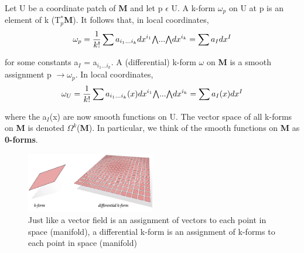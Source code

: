 Let U be a coordinate patch of \textbf{M} and let p $\epsilon$ U. A k-form $\omega_p$ on U at p is an element of k (T$_p^*$\textbf{M}). 
It follows that, in local coordinates,
\begin{equation}
    \omega_p = \frac{1}{k!}\sum a_{i_1...i_k}dx^{i_1}\exterior...\exterior dx^{i_k} = \sum a_I dx^I
\end{equation}

for some constants a$_I$ = a$_{i_1...i_k}$. A (differential) k-form $\omega$ on \textbf{M} is a smooth
assignment p $\rightarrow \omega_p$. In local coordinates,
\begin{equation}
    \omega_U = \frac{1}{k!}\sum a_{i_1...i_k}(x)dx^{i_1}\exterior...\exterior dx^{i_k} = \sum a_I(x) dx^I
\end{equation}

where the a$_I$(x) are now smooth functions on U. 
The vector space of all k-forms on \textbf{M} is denoted $\Omega^k$(\textbf{M}). 
In particular, we think of the smooth functions on \textbf{M} as \textbf{0-forms}.

\begin{figure}[h]
    \begin{center}
        \includegraphics[width=0.5\textwidth]{figures/differential_k-form.png}
        \caption{Just like a vector field is an assignment of vectors to each point in space (manifold), 
        a differential k-form is an assignment of k-forms to each point in space (manifold)}
    \end{center}
\end{figure}

\newpage
